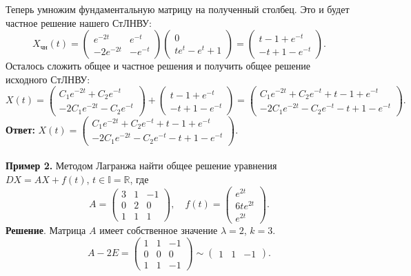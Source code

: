 \documentclass[a4paper, 12pt]{article}
\newcommand{\Rm}{\mathbb{R}}
\newcommand{\I}{\mathbb{I}}
\begin{document}
Теперь умножим фундаментальную матрицу на полученный столбец. Это и будет частное решение нашего СтЛНВУ:
$$X_{\text{чн}}(t) = \begin{pmatrix}
	e^{-2t} & e^{-t}\\
-2e^{-2t} & -e^{-t}
\end{pmatrix}\begin{pmatrix}
0\\
te^t - e^t + 1
\end{pmatrix} = \begin{pmatrix}
t - 1 + e^{-t}\\
-t + 1 - e^{-t}
\end{pmatrix}.$$
Осталось сложить общее и частное решения и получить общее решение исходного СтЛНВУ:
$$X(t) = \begin{pmatrix}
C_1e^{-2t} + C_2e^{-t}\\
-2C_1e^{-2t} - C_2e^{-t}
\end{pmatrix} + \begin{pmatrix}
t - 1 + e^{-t}\\
-t + 1 - e^{-t}
\end{pmatrix} = \begin{pmatrix}
C_1e^{-2t} + C_2e^{-t} + t - 1 + e^{-t}\\
-2C_1e^{-2t} - C_2e^{-t} -t + 1 - e^{-t}
\end{pmatrix}.$$
\textbf{Ответ:} $X(t) = \begin{pmatrix}
C_1e^{-2t} + C_2e^{-t} + t - 1 + e^{-t}\\
-2C_1e^{-2t} - C_2e^{-t} -t + 1 - e^{-t}
\end{pmatrix}.$\\\\
\textbf{Пример 2.} Методом Лагранжа найти общее решение уравнения $DX = AX + f(t)$, $t \in \I = \Rm$, где $$A = \begin{pmatrix}
	3 & 1 & -1\\
	0 & 2 & 0\\
	1 & 1 & 1
\end{pmatrix}, \quad f(t) =\begin{pmatrix}
	e^{2t}\\
	6te^{2t}\\
	e^{2t}
\end{pmatrix}.$$
\textbf{Решение}. Матрица $A$ имеет собственное значение $\lambda = 2$, $k = 3$. 
$$A - 2E = \begin{pmatrix}
	1 & 1 & -1\\
	0 & 0 & 0\\
	1 & 1 & -1
\end{pmatrix}\sim \begin{pmatrix}
1 & 1 & -1
\end{pmatrix}.$$
\end{document}
